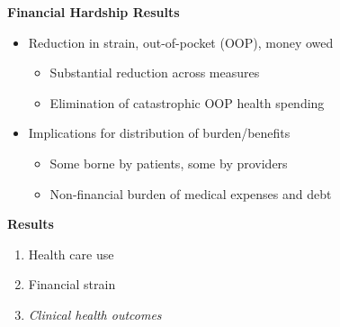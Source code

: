 \documentclass[notes=show]{beamer}
\begin{document}
\begin{frame}[plain]
	\begin{center}
	\textbf{Financial Hardship Results}
	\end{center}
	
	\begin{itemize}
	\item Reduction in strain, out-of-pocket (OOP), money owed
		\begin{itemize}
		\item Substantial reduction across measures
		\item Elimination of catastrophic OOP health spending
		\end{itemize}
	\item Implications for distribution of burden/benefits
		\begin{itemize}
		\item Some borne by patients, some by providers
		\item Non-financial burden of medical expenses and debt
		\end{itemize}
	\end{itemize}
\end{frame}

\begin{frame}[plain]
	\begin{center}
	\textbf{Results}
	\end{center}
	
	\begin{enumerate}
	\item Health care use
	\item Financial strain
	\item \emph{Clinical health outcomes}
	\end{enumerate}
	
\end{frame}
\end{document}
